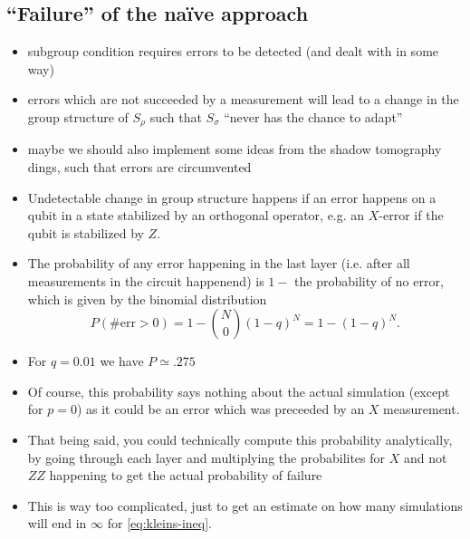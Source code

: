 \subsection{\enquote{Failure} of the na\"ive approach}
\begin{itemize}
  \item subgroup condition requires errors to be detected (and dealt with in
    some way)
  \item errors which are not succeeded by a measurement will lead to a change
    in the group structure of $S_\rho$ such that $S_\sigma$ \enquote{never has
    the chance to adapt}
  \item maybe we should also implement some ideas from the shadow tomography
    dings, such that errors are circumvented
  \item Undetectable change in group structure happens if an error happens on a
    qubit in a state stabilized by an orthogonal operator, e.g. an $X$-error if
    the qubit is stabilized by $Z$.
  \item The probability of any error happening in the last layer (i.e. after
    all measurements in the circuit happenend) is $1-$ the probability of no
    error, which is given by the binomial distribution
    \[ P(\#\mathrm{err}>0) = 1-\binom{N}{0} (1-q)^N=1-(1-q)^N. \]
  \item For $q=\num{0.01}$ we have $P\simeq .275$
  \item Of course, this probability says nothing about the actual simulation
    (except for $p=0$) as it could be an error which was preceeded by an $X$
    measurement.
  \item That being said, you could technically compute this probability
    analytically, by going through each layer and multiplying the probabilites
    for $X$ and not $ZZ$ happening to get the actual probability of failure
   \item This is way too complicated, just to get an estimate on how many
     simulations will end in $\infty$ for \cref{eq:kleins-ineq}. 
\end{itemize}
\clearpage
